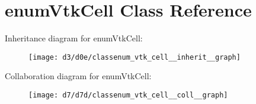 \hypertarget{classenum_vtk_cell}{}\section{enum\+Vtk\+Cell Class Reference}
\label{classenum_vtk_cell}


Inheritance diagram for enum\+Vtk\+Cell\+:
\nopagebreak
\begin{figure}[H]
\begin{center}
\leavevmode
\texttt{[image: d3/d0e/classenum\_vtk\_cell\_\_inherit\_\_graph]}
\end{center}
\end{figure}


Collaboration diagram for enum\+Vtk\+Cell\+:
\nopagebreak
\begin{figure}[H]
\begin{center}
\leavevmode
\texttt{[image: d7/d7d/classenum\_vtk\_cell\_\_coll\_\_graph]}
\end{center}
\end{figure}
